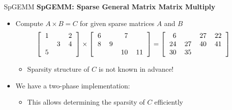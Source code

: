 \begin{frame}[fragile]{SpGEMM}
\textbf{SpGEMM: Sparse General Matrix Matrix Multiply}
 
\vspace{.4cm}

\begin{itemize}

  \item Compute $A\times B=C$ for given sparse matrices $A$ and $B$
  \begin{equation*}
  \left[ 
  \begin{tabular}{ccc}
	1 &    & 2 \\
   	   & 3 & 4 \\
        5 &    & 
  \end{tabular}
  \right]
  \times
  \left[ 
  \begin{tabular}{r r r r}
	6 &    & 7 & \\
   	8 & 9 &    & \\
           &    &10&11 
  \end{tabular}
  \right] 
  =
    \left[ 
  \begin{tabular}{r r r r}
	  6 &      & 27 & 22 \\
   	24 & 27 & 40 & 41 \\
        30 & 35 &      &      \\ 
  \end{tabular}
  \right]   
\end{equation*}
  \begin{itemize}
     \item Sparsity structure of $C$ is not known in advance!
  \end{itemize}
  
  \vspace{.4cm}
  
  \item We have a two-phase implementation:
  \begin{itemize}
    \item This allows determining the sparsity of $C$ efficiently
  \end{itemize}
 \end{itemize}  
\end{frame}

